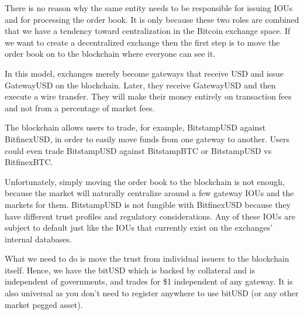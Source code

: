 There is no reason why the same entity needs to be responsible for issuing IOUs
and for processing the order book. It is only because these two roles are
combined that we have a tendency toward centralization in the Bitcoin exchange
space. If we want to create a decentralized exchange then the first step is to
move the order book on to the blockchain where everyone can see it.

In this model, exchanges merely become gateways that receive USD and issue
GatewayUSD on the blockchain. Later, they receive GatewayUSD and then execute a
wire transfer. They will make their money entirely on transaction fees and not
from a percentage of market fees.

The blockchain allows users to trade, for example, BitstampUSD against
BitfinexUSD, in order to easily move funds from one gateway to another. Users
could even trade BitstampUSD against BitstampBTC or BitstampUSD vs BitfinexBTC.

Unfortunately, simply moving the order book to the blockchain is not enough,
because the market will naturally centralize around a few gateway IOUs and the
markets for them. BitstampUSD is not fungible with BitfinexUSD because they
have different trust profiles and regulatory considerations. Any of these IOUs
are subject to default just like the IOUs that currently exist on the
exchanges' internal databases. 

What we need to do is move the trust from individual issuers to the blockchain
itself. Hence, we have the bitUSD which is backed by collateral and is
independent of governments, and trades for \$1 independent of any gateway. It
is also universal as you don't need to register anywhere to use bitUSD (or any
other market pegged asset).
